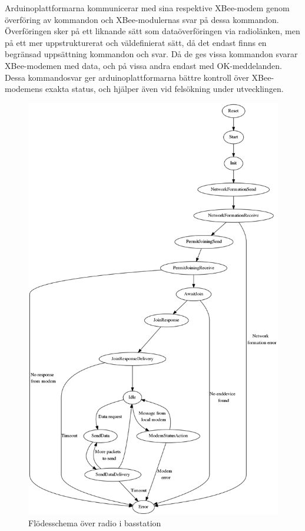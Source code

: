 \documentclass[a4paper,11pt]{article}
\begin{document}
Arduinoplattformarna kommunicerar med sina respektive XBee-modem genom överföring av kommandon och XBee-modulernas svar på dessa kommandon. Överföringen sker på ett liknande sätt som dataöverföringen via radiolänken, men på ett mer uppstrukturerat och väldefinierat sätt, då det endast finns en begränsad uppsättning kommandon och svar. Då de ges vissa kommandon svarar XBee-modemen med data, och på vissa andra endast med OK-meddelanden. Dessa kommandosvar ger arduinoplattformarna bättre kontroll över XBee-modemens exakta status, och hjälper även vid felsökning under utvecklingen. \\

\begin{figure}[H]
\begin{center}
\includegraphics[scale=0.3, angle=0]{basFSM.png}
\end{center}
\caption{Flödesschema över radio i basstation}
\label{fig:radio_bas}
\end{figure}
\end{document}
